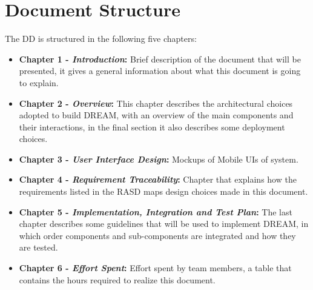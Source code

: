 \section{Document Structure}

The DD is structured in the following five chapters:
\begin{itemize}
\item \textbf{Chapter 1 -  \textit{Introduction}:} 
Brief description of the document that will be presented, it gives a general information about what this document is going to explain.
\item \textbf{Chapter 2 -  \textit{Overview}:} 
This chapter describes the architectural choices adopted to build DREAM, with an overview of the main components and their interactions, in the final section it also describes some deployment choices.
\item \textbf{Chapter 3 -  \textit{User Interface Design}:} 
Mockups of Mobile UIs of system.
\item \textbf{Chapter 4 -  \textit{Requirement Traceability}:} 
Chapter that explains how the requirements listed in the RASD maps design choices made in this document.
\item \textbf{Chapter 5 -  \textit{Implementation, Integration and Test Plan}:}
The last chapter describes some guidelines that will be used to implement DREAM, in which order components and sub-components are integrated and how they are tested.
\item \textbf{Chapter 6 -  \textit{Effort Spent}:} 
Effort spent by team members, a table that contains the hours required to realize this document.
\end{itemize}